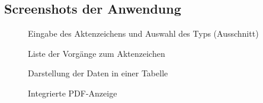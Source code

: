 \subsection{Screenshots der Anwendung}
\label{Screenshots}
\begin{figure}[h]
\centering
{}
\caption{Eingabe des Aktenzeichens und Auswahl des Typs (Ausschnitt)}
\end{figure}

\begin{figure}[h]
\centering
{}
\caption{Liste der Vorgänge zum Aktenzeichen}
\end{figure}
\clearpage
\begin{figure}[h]
    \centering
    \caption{Darstellung der Daten in einer Tabelle}
\end{figure}

\begin{figure}[h]
    \centering
    \caption{Integrierte PDF-Anzeige}
\end{figure}
\clearpage
